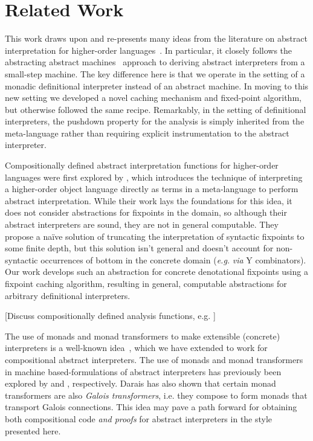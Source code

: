 \section{Related Work}\label{s:related-work}

This work draws upon and re-presents many ideas from the literature on
abstract interpretation for higher-order
languages~\cite{dvanhorn:Midtgaard2012Controlflow}.  In particular, it
closely follows the abstracting abstract
machines~\cite{dvanhorn:VanHorn2010Abstracting,dvanhorn:VanHorn2012Systematic}
approach to deriving abstract interpreters from a small-step
machine. The key difference here is that we operate in the setting of
a monadic definitional interpreter instead of an abstract machine. In
moving to this new setting we developed a novel caching mechanism and
fixed-point algorithm, but otherwise followed the same
recipe. Remarkably, in the setting of definitional interpreters, the
pushdown property for the analysis is simply inherited from the
meta-language rather than requiring explicit instrumentation to the
abstract interpreter.

Compositionally defined abstract interpretation functions for
higher-order languages were first explored by
\citet{local:jones-book1995}, which introduces the technique of
interpreting a higher-order object language directly as terms in a
meta-language to perform abstract interpretation. While their work
lays the foundations for this idea, it does not consider abstractions
for fixpoints in the domain, so although their abstract interpreters
are sound, they are not in general computable. They propose a naïve
solution of truncating the interpretation of syntactic fixpoints to
some finite depth, but this solution isn't general and doesn't account
for non-syntactic occurrences of bottom in the concrete domain (\emph{e.g.}
\emph{via} Y combinators). Our work develops such an abstraction for concrete
denotational fixpoints using a fixpoint caching algorithm, resulting in
general, computable abstractions for arbitrary definitional interpreters.

[Discuss compositionally defined analysis functions,
  e.g. \cite{dvanhorn:citeulike:14288879}]

The use of monads and monad transformers to make extensible (concrete)
interpreters is a well-known
idea~\cite{davdar:Moggi:1989:Monads,local:steele-popl94,dvanhorn:Liang1995Monad},
which we have extended to work for compositional abstract
interpreters.  The use of monads and monad transformers in machine
based-formulations of abstract interpreters has previously been
explored by \citet{dvanhorn:Sergey2013Monadic} and
\citet{local:darais-oopsla2015}, respectively.  Darais has also shown
that certain monad transformers are also \emph{Galois transformers},
i.e. they compose to form monads that transport Galois connections.
This idea may pave a path forward for obtaining both compositional
code \emph{and proofs} for abstract interpreters in the style
presented here.

